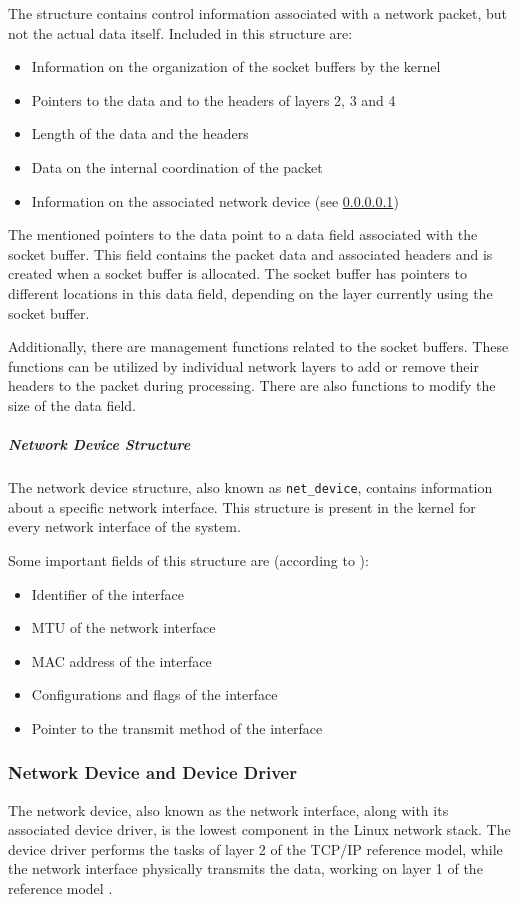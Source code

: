 The structure contains control information associated with a network packet, but not the actual data itself. Included in this structure are:

\begin{itemize}
\item Information on the organization of the socket buffers by the kernel
\item Pointers to the data and to the headers of layers 2, 3 and 4
\item Length of the data and the headers
\item Data on the internal coordination of the packet
\item Information on the associated network device (see \ref{chap:netdevice})
\end{itemize}

The mentioned pointers to the data point to a data field associated with the socket buffer. This field contains the packet data and associated headers and is created when a socket buffer is allocated. The socket buffer has pointers to different locations in this data field, depending on the layer currently using the socket buffer.

Additionally, there are management functions related to the socket buffers. These functions can be utilized by individual network layers to add or remove their headers to the packet during processing. There are also functions to modify the size of the data field.

\subparagraph{Network Device Structure} \label{chap:netdevice}
The network device structure, also known as \texttt{net\_device}, contains information about a specific network interface. This structure is present in the kernel for every network interface of the system.

Some important fields of this structure are (according to \cite{lins01}):
\begin{itemize}
\item Identifier of the interface
\item MTU of the network interface
\item MAC address of the interface
\item Configurations and flags of the interface
\item Pointer to the transmit method of the interface
\end{itemize}

\subsubsection{Network Device and Device Driver}
The network device, also known as the network interface, along with its associated device driver, is the lowest component in the Linux network stack. The device driver performs the tasks of layer 2 of the TCP/IP reference model, while the network interface physically transmits the data, working on layer 1 of the reference model \cite{lins01}.

